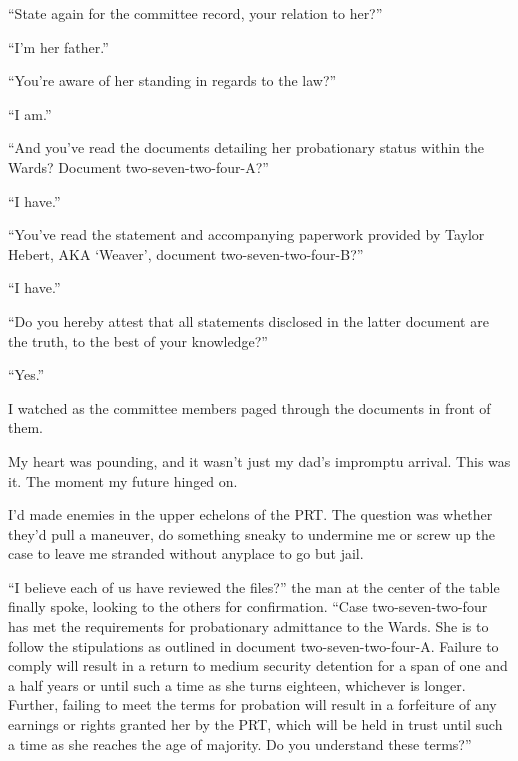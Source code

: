 ``State again for the committee record, your relation to her?''



``I'm her father.''



``You're aware of her standing in regards to the law?''



``I am.''



``And you've read the documents detailing her probationary status within the Wards?  Document two-seven-two-four-A?''



``I have.''



``You've read the statement and accompanying paperwork provided by Taylor Hebert, AKA `Weaver', document two-seven-two-four-B?''



``I have.''



``Do you hereby attest that all statements disclosed in the latter document are the truth, to the best of your knowledge?''



``Yes.''



I watched as the committee members paged through the documents in front of them.



My heart was pounding, and it wasn't just my dad's impromptu arrival.  This was it.  The moment my future hinged on.



I'd made enemies in the upper echelons of the PRT.  The question was whether they'd pull a maneuver, do something sneaky to undermine me or screw up the case to leave me stranded without anyplace to go but jail.



``I believe each of us have reviewed the files?'' the man at the center of the table finally spoke, looking to the others for confirmation.  ``Case two-seven-two-four has met the requirements for probationary admittance to the Wards.  She is to follow the stipulations as outlined in document two-seven-two-four-A.  Failure to comply will result in a return to medium security detention for a span of one and a half years or until such a time as she turns eighteen, whichever is longer.  Further, failing to meet the terms for probation will result in a forfeiture of any earnings or rights granted her by the PRT, which will be held in trust until such a time as she reaches the age of majority.  Do you understand these terms?''



